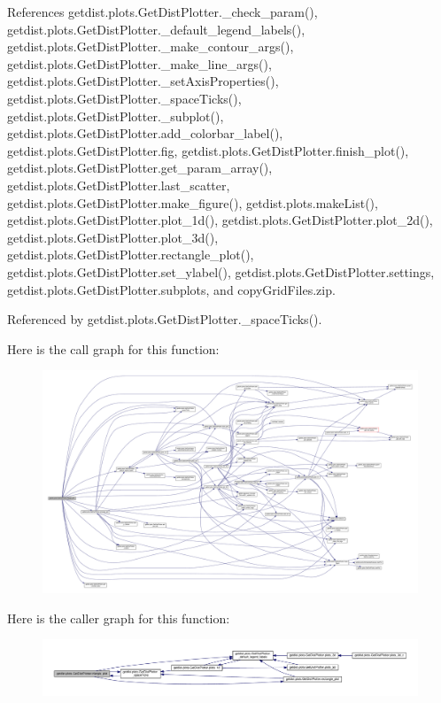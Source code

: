 References getdist.\+plots.\+Get\+Dist\+Plotter.\+\_\+check\+\_\+param(), getdist.\+plots.\+Get\+Dist\+Plotter.\+\_\+default\+\_\+legend\+\_\+labels(), getdist.\+plots.\+Get\+Dist\+Plotter.\+\_\+make\+\_\+contour\+\_\+args(), getdist.\+plots.\+Get\+Dist\+Plotter.\+\_\+make\+\_\+line\+\_\+args(), getdist.\+plots.\+Get\+Dist\+Plotter.\+\_\+set\+Axis\+Properties(), getdist.\+plots.\+Get\+Dist\+Plotter.\+\_\+space\+Ticks(), getdist.\+plots.\+Get\+Dist\+Plotter.\+\_\+subplot(), getdist.\+plots.\+Get\+Dist\+Plotter.\+add\+\_\+colorbar\+\_\+label(), getdist.\+plots.\+Get\+Dist\+Plotter.\+fig, getdist.\+plots.\+Get\+Dist\+Plotter.\+finish\+\_\+plot(), getdist.\+plots.\+Get\+Dist\+Plotter.\+get\+\_\+param\+\_\+array(), getdist.\+plots.\+Get\+Dist\+Plotter.\+last\+\_\+scatter, getdist.\+plots.\+Get\+Dist\+Plotter.\+make\+\_\+figure(), getdist.\+plots.\+make\+List(), getdist.\+plots.\+Get\+Dist\+Plotter.\+plot\+\_\+1d(), getdist.\+plots.\+Get\+Dist\+Plotter.\+plot\+\_\+2d(), getdist.\+plots.\+Get\+Dist\+Plotter.\+plot\+\_\+3d(), getdist.\+plots.\+Get\+Dist\+Plotter.\+rectangle\+\_\+plot(), getdist.\+plots.\+Get\+Dist\+Plotter.\+set\+\_\+ylabel(), getdist.\+plots.\+Get\+Dist\+Plotter.\+settings, getdist.\+plots.\+Get\+Dist\+Plotter.\+subplots, and copy\+Grid\+Files.\+zip.



Referenced by getdist.\+plots.\+Get\+Dist\+Plotter.\+\_\+space\+Ticks().

Here is the call graph for this function\+:
\nopagebreak
\begin{figure}[H]
\begin{center}
\leavevmode
\includegraphics[width=350pt]{classgetdist_1_1plots_1_1GetDistPlotter_a92380ecaa3180adba902208e5d646329_cgraph}
\end{center}
\end{figure}
Here is the caller graph for this function\+:
\nopagebreak
\begin{figure}[H]
\begin{center}
\leavevmode
\includegraphics[width=350pt]{classgetdist_1_1plots_1_1GetDistPlotter_a92380ecaa3180adba902208e5d646329_icgraph}
\end{center}
\end{figure}


